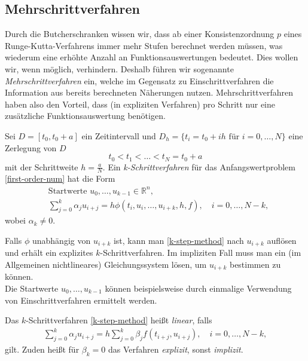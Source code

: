 \subsection{Mehrschrittverfahren}
\label{subsec:multistep}
Durch die Butcherschranken wissen wir, dass ab einer Konsistenzordnung $p$ eines Runge-Kutta-Verfahrens immer mehr
Stufen berechnet werden müssen, was wiederum eine erhöhte Anzahl an Funktionsauswertungen bedeutet. Dies wollen wir,
wenn möglich, verhindern. Deshalb führen wir sogenannte \textit{Mehrschrittverfahren} ein, welche im Gegensatz zu
Einschrittverfahren die Information aus bereits berechneten Näherungen nutzen. Mehrschrittverfahren haben also den
Vorteil, dass (in expliziten Verfahren) pro Schritt nur eine zusätzliche Funktionsauswertung benötigen.
\begin{definition}
    Sei $D = \left[ t_0, t_0 +a \right]$ ein Zeitintervall und  $D_h= \{ t_i = t_0 + ih \text{ für } i = 0, \dots, N\}$
    eine Zerlegung von $D$
    \[
        t_0 < t_1 < \dots < t_N = t_0 + a
    \]
    mit der Schrittweite $h = \frac{a}{N}$. Ein {\em k-Schrittverfahren} für das Anfangswertproblem
    \eqref{first-order-num} hat die Form
    \begin{align}
        \label{k-step-method}
        &\text{Startwerte } u_0, \dots, u_{k-1} \in \mathbb{R}^n, \nonumber \\
        & \sum_{j=0}^{k} \alpha_j u_{i+j} = h \phi(t_i, u_i, \dots, u_{i+k},h,f), \quad i=0,\dots,N-k,
    \end{align}
    wobei $\alpha_k \neq 0$.
\end{definition}
Falls $\phi$ unabhängig von $u_{i+k}$ ist, kann man \eqref{k-step-method} nach $u_{i+k}$
auflösen und erhält ein explizites $k$-Schrittverfahren. Im impliziten Fall muss man ein (im Allgemeinen nichtlineares)
Gleichungssystem lösen, um $u_{i+k}$ bestimmen zu können.\\
Die Startwerte $u_0, \dots, u_{k-1}$ können beispielsweise durch einmalige Verwendung von Einschrittverfahren ermittelt
werden.
\begin{definition}
    Das $k$-Schrittverfahren \eqref{k-step-method} heißt {\em linear}, falls
    \begin{align}
        \label{k-step-linear}
        \sum_{j=0}^{k} \alpha_j u_{i+j} = h \sum_{j=0}^{k} \beta_j f(t_{i+j}, u_{i+j}), \quad i = 0, \dots, N-k,
    \end{align}
    gilt. Zuden heißt für $\beta_k = 0$ das Verfahren {\em explizit}, sonst {\em implizit}.
\end{definition}
